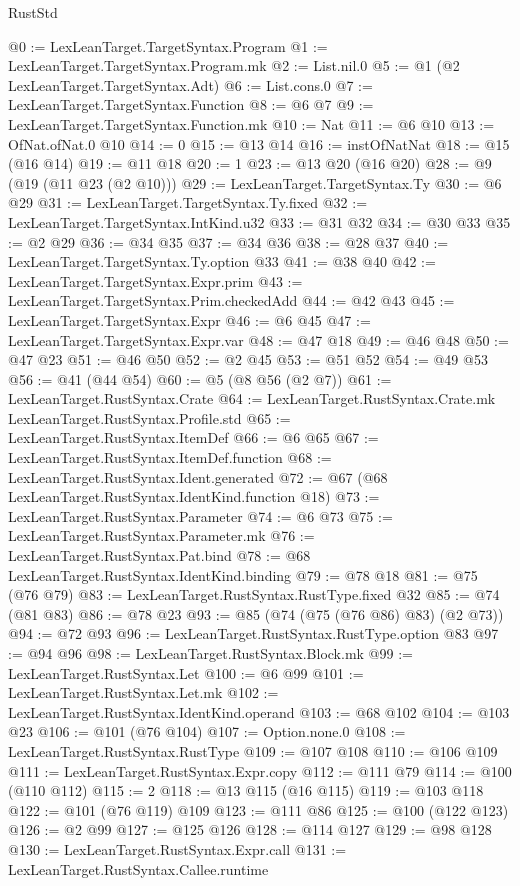\begin{lexlean}{RustStd}
\begin{coremodule}
@0 := LexLeanTarget.TargetSyntax.Program
@1 := LexLeanTarget.TargetSyntax.Program.mk
@2 := List.nil.{0}
@5 := @1 (@2 LexLeanTarget.TargetSyntax.Adt)
@6 := List.cons.{0}
@7 := LexLeanTarget.TargetSyntax.Function
@8 := @6 @7
@9 := LexLeanTarget.TargetSyntax.Function.mk
@10 := Nat
@11 := @6 @10
@13 := OfNat.ofNat.{0} @10
@14 := 0
@15 := @13 @14
@16 := instOfNatNat
@18 := @15 (@16 @14)
@19 := @11 @18
@20 := 1
@23 := @13 @20 (@16 @20)
@28 := @9 (@19 (@11 @23 (@2 @10)))
@29 := LexLeanTarget.TargetSyntax.Ty
@30 := @6 @29
@31 := LexLeanTarget.TargetSyntax.Ty.fixed
@32 := LexLeanTarget.TargetSyntax.IntKind.u32
@33 := @31 @32
@34 := @30 @33
@35 := @2 @29
@36 := @34 @35
@37 := @34 @36
@38 := @28 @37
@40 := LexLeanTarget.TargetSyntax.Ty.option @33
@41 := @38 @40
@42 := LexLeanTarget.TargetSyntax.Expr.prim
@43 := LexLeanTarget.TargetSyntax.Prim.checkedAdd
@44 := @42 @43
@45 := LexLeanTarget.TargetSyntax.Expr
@46 := @6 @45
@47 := LexLeanTarget.TargetSyntax.Expr.var
@48 := @47 @18
@49 := @46 @48
@50 := @47 @23
@51 := @46 @50
@52 := @2 @45
@53 := @51 @52
@54 := @49 @53
@56 := @41 (@44 @54)
@60 := @5 (@8 @56 (@2 @7))
@61 := LexLeanTarget.RustSyntax.Crate
@64 := LexLeanTarget.RustSyntax.Crate.mk LexLeanTarget.RustSyntax.Profile.std
@65 := LexLeanTarget.RustSyntax.ItemDef
@66 := @6 @65
@67 := LexLeanTarget.RustSyntax.ItemDef.function
@68 := LexLeanTarget.RustSyntax.Ident.generated
@72 := @67 (@68 LexLeanTarget.RustSyntax.IdentKind.function @18)
@73 := LexLeanTarget.RustSyntax.Parameter
@74 := @6 @73
@75 := LexLeanTarget.RustSyntax.Parameter.mk
@76 := LexLeanTarget.RustSyntax.Pat.bind
@78 := @68 LexLeanTarget.RustSyntax.IdentKind.binding
@79 := @78 @18
@81 := @75 (@76 @79)
@83 := LexLeanTarget.RustSyntax.RustType.fixed @32
@85 := @74 (@81 @83)
@86 := @78 @23
@93 := @85 (@74 (@75 (@76 @86) @83) (@2 @73))
@94 := @72 @93
@96 := LexLeanTarget.RustSyntax.RustType.option @83
@97 := @94 @96
@98 := LexLeanTarget.RustSyntax.Block.mk
@99 := LexLeanTarget.RustSyntax.Let
@100 := @6 @99
@101 := LexLeanTarget.RustSyntax.Let.mk
@102 := LexLeanTarget.RustSyntax.IdentKind.operand
@103 := @68 @102
@104 := @103 @23
@106 := @101 (@76 @104)
@107 := Option.none.{0}
@108 := LexLeanTarget.RustSyntax.RustType
@109 := @107 @108
@110 := @106 @109
@111 := LexLeanTarget.RustSyntax.Expr.copy
@112 := @111 @79
@114 := @100 (@110 @112)
@115 := 2
@118 := @13 @115 (@16 @115)
@119 := @103 @118
@122 := @101 (@76 @119) @109
@123 := @111 @86
@125 := @100 (@122 @123)
@126 := @2 @99
@127 := @125 @126
@128 := @114 @127
@129 := @98 @128
@130 := LexLeanTarget.RustSyntax.Expr.call
@131 := LexLeanTarget.RustSyntax.Callee.runtime

\end{coremodule}
\end{lexlean}
